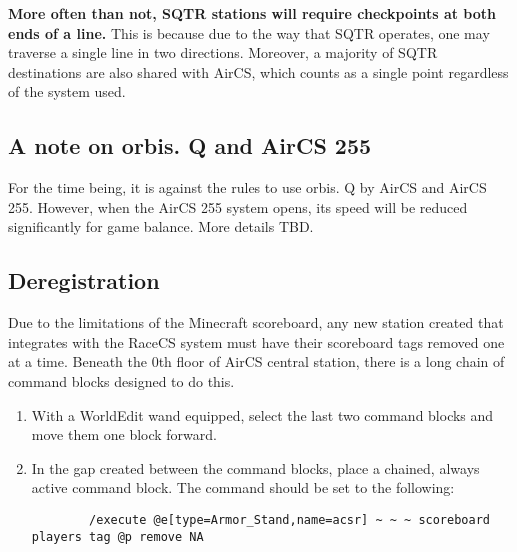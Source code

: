 \documentclass{article}
\begin{document}
\medskip

\textbf{More often than not, SQTR stations will require checkpoints at both ends of a line.} This is because due to the way that SQTR operates, one may traverse a single line in two directions. Moreover, a majority of SQTR destinations are also shared with AirCS, which counts as a single point regardless of the system used.
\subsection{A note on orbis. Q and AirCS 255}
For the time being, it is against the rules to use orbis. Q by AirCS and AirCS 255. However, when the AirCS 255 system opens, its speed will be reduced significantly for game balance. More details TBD.

\subsection{Deregistration}
Due to the limitations of the Minecraft scoreboard, any new station created that integrates with the RaceCS system must have their scoreboard tags removed one at a time. Beneath the 0th floor of AirCS central station, there is a long chain of command blocks designed to do this. 
\begin{enumerate}
    \item With a WorldEdit wand equipped, select the last two command blocks and move them one block forward.
    \item In the gap created between the command blocks, place a chained, always active command block. The command should be set to the following:
    \begin{lstlisting}
        /execute @e[type=Armor_Stand,name=acsr] ~ ~ ~ scoreboard players tag @p remove NA
    \end{lstlisting}
\end{enumerate}

\pagebreak
\end{document}
